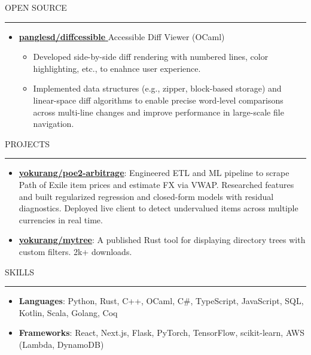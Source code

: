 \documentclass[letterpaper, 11pt]{article}
\def\sectionlineskip{\medskip}
\def\sectionskip{\medskip}
\def \entryspacing {-0pt}
\newcommand{\SectionHeading}[1]{
  \sectionskip
  \raggedright\raggedbottom\MakeUppercase{\large{#1}}
  \sectionlineskip
  \hrule
  \color{black}
}
\newcommand{\ResumeItem}[2]{
  \item{
    \textbf{#1}{: #2 \vspace{-2.835pt}}
  }
}
\newcommand{\ResumeItemDefault}[1]{
  \item{
    #1 \vspace{-2.835pt}
  }
}
\newcommand{\ResumeProjectItem}[3]{
  \item{
    \href{#2}{\textbf{#1}}{: #3 \vspace{-2.835pt}}
  }
}
\newcommand{\ResumeEntryStart}{\begin{itemize}[leftmargin=0mm, label={}]}
\newcommand{\ResumeEntryEnd}{\end{itemize}\vspace{-2.835pt}} %
\newcommand{\ResumeItemListStart}{\begin{itemize}[leftmargin=5mm, label=$\bullet$, itemsep=1mm, parsep=1mm]} %
\newcommand{\ResumeItemListEnd}{\end{itemize}}
\newcommand{\ProjectItemListStart}{\begin{itemize}[leftmargin=*, label=$\bullet$]}
\newcommand{\ProjectItemListEnd}{\end{itemize}\vspace{\entryspacing}}
\newcommand{\OpenSourceProjectItem}[3]{
  \item{
    \href{#1}{\textbf{#2} }\hfill{#3}\vspace{-2.835pt}
  }
}
\begin{document}
  \SectionHeading{Open Source}
    \ResumeEntryStart
    \OpenSourceProjectItem{https://github.com/panglesd/diffcessible}{panglesd/diffcessible}{Accessible Diff Viewer (OCaml)}
    \ResumeItemListStart
      \ResumeItemDefault{Developed side-by-side diff rendering with numbered lines, color highlighting, etc., to enahnce user experience.}

      \ResumeItemDefault{Implemented data structures (e.g., zipper, block-based storage) and linear-space diff algorithms to enable precise word-level comparisons across multi-line changes and improve performance in large-scale file navigation.}

    \ResumeItemListEnd
  \ResumeEntryEnd

  \SectionHeading{Projects}
  \ProjectItemListStart
  
    \ResumeProjectItem{yokurang/poe2-arbitrage}
    {https://github.com/yokurang/path-of-elixe}
    {Engineered ETL and ML pipeline to scrape Path of Exile item prices and estimate FX via VWAP. Researched features and built regularized regression and closed-form models with residual diagnostics. Deployed live client to detect undervalued items across multiple currencies in real time.}

    \ResumeProjectItem{yokurang/mytree}
    {https://github.com/yokurang/mytree}
    {A published Rust tool for displaying directory trees with custom filters. 2k+ downloads.}

  \ProjectItemListEnd

  \SectionHeading{Skills}
  \ResumeEntryStart
    \ResumeItem{Languages}{ Python, Rust, C++, OCaml, C\#, TypeScript, JavaScript, SQL, Kotlin, Scala, Golang, Coq }
    \ResumeItem{Frameworks}{ React, Next.js, Flask, PyTorch, TensorFlow, scikit-learn, AWS (Lambda, DynamoDB) }
  \ResumeEntryEnd
\end{document}
